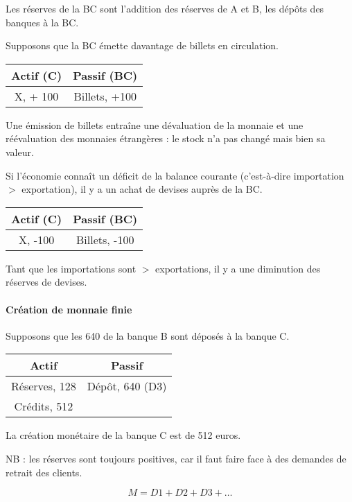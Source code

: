 	Les réserves de la BC sont l'addition des réserves de A et B, les dépôts des banques à la BC.
	
	Supposons que la BC émette davantage de billets en circulation.
	
\begin{center}
	\begin{tabular}{c|c}
	Actif (C) & Passif (BC) \\ 
	\hline 
	X, + 100 & Billets, +100 
	\end{tabular}
\end{center}
	
	Une émission de billets entraîne une dévaluation de la monnaie et une réévaluation des monnaies étrangères : le stock n'a pas changé mais bien sa valeur.
	
	Si l'économie connaît un déficit de la balance courante (c'est-à-dire importation $>$ exportation), il y a un achat de devises auprès de la BC.
	
\begin{center}
	\begin{tabular}{c|c}
	Actif (C) & Passif (BC) \\ 
	\hline 
	X, -100 & Billets, -100
	\end{tabular}
\end{center}
	
	Tant que les importations sont $>$ exportations, il y a une diminution des réserves de devises.
	
	
	\paragraph{Création de monnaie finie}
	Supposons que les 640 de la banque B sont déposés à la banque C.
	
\begin{center}
	\begin{tabular}{c|c}
	Actif & Passif \\ 
	\hline 
	Réserves, 128 & Dépôt, 640 (D3) \\ 
	Crédits, 512 &  
	\end{tabular} 
\end{center}
	
	La création monétaire de la banque C est de 512 euros.
	
	NB : les réserves sont toujours positives, car il faut faire face à des demandes de retrait des clients.
	
	$$M = D1 + D2 + D3 + \dots$$
	
